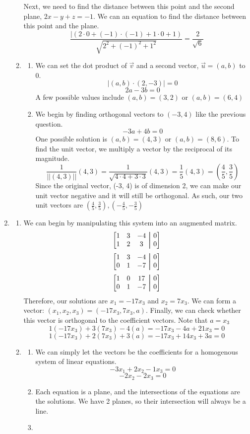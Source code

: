 \documentclass[11pt, letterpaper, twoside]{article}
\newcommand\aug{\fboxsep=-\fboxrule\!\!\!\fbox{\strut}\!\!\!} %
\begin{document}
\begin{enumerate}
\begin{enumerate}[label=\alph*)]
Next, we need to find the distance between this point and the second plane, \(2x-y+z=-1\).
We can an equation to find the distance between this point and the plane.
\[\frac{|(2\cdot0+(-1)\cdot(-1)+1\cdot0+1)}{\sqrt{2^2+(-1)^2+1^2}}=\boxed{\frac{2}{\sqrt{6}}}\]
\item \begin{enumerate}[label=\roman*)]
Two vectors are orthogonal if \(|a\cdot b|=0\).
\[|a\cdot b|=-ab+ab=0\]
Therefore, these two vectors are orthogonal.
\item We can set the dot product of \(\vec v\) and a second vector, \(\vec{u}=(a,b)\) to 0.
\[|(a,b)\cdot(2,-3)|=0\]
\[2a-3b=0\]
A few possible values include \((a,b)=(3,2)\) or \((a,b)=(6,4)\)
\item We begin by finding orthogonal vectors to \((-3,4)\) like the previous question.
\[-3a+4b=0\]
One possible solution is \((a,b)=(4,3)\) or \((a,b)=(8,6)\).
To find the unit vector, we multiply a vector by the reciprocal of its magnitude.
\[\frac{1}{||(4,3)||}(4,3)=\frac{1}{\sqrt{4\cdot4+3\cdot3}}(4,3)=\frac{1}{5}(4,3)=\left(\frac{4}{5},\frac{3}{5}\right)\]
Since the original vector, (-3, 4) is of dimension 2, we can make our unit vector negative and it will still be orthogonal. 
As such, our two unit vectors are \(\boxed{\left(\frac{4}{5}, \frac{3}{5}\right), \left(-\frac{4}{5}, -\frac{3}{5}\right)}\)
\end{enumerate}
\end{enumerate} 
\item 
\begin{enumerate}[label=\alph*)]
\item 
We can begin by manipulating this system into an augmented matrix.
\[\begin{bmatrix}
1&3&-4&\aug&0\\
1&2&3&\aug&0
\end{bmatrix}\]
\[\begin{bmatrix}
1&3&-4&\aug&0\\
0&1&-7&\aug&0
\end{bmatrix}\]
\[\begin{bmatrix}
1&0&17&\aug&0\\
0&1&-7&\aug&0
\end{bmatrix}\]
Therefore, our solutions are \(x_1=-17x_3\) and \(x_2=7x_3\). We can form a vector: \((x_1, x_2, x_3)=(-17x_3, 7x_3, a)\). 
Finally, we can check whether this vector is orthogonal to the coefficient vectors. Note that \(a=x_3\)
\[1(-17x_3)+3(7x_3)-4(a)=-17x_3-4a+21x_3=0\]
\[1(-17x_3)+2(7x_3)+3(a)=-17x_3+14x_3+3a=0\]
\item \begin{enumerate}[label=\roman*)]
\item We can simply let the vectors be the coefficients for a homogenous system of linear equations.
\[-3x_1+2x_2-1x_3=0\]
\[-2x_2-2x_3=0\]
\item Each equation is a plane, and the intersections of the equations are the solutions.
We have 2 planes, so their intersection will always be a line.
\item %
\end{enumerate}
\end{enumerate}
\end{enumerate}
\end{document}
